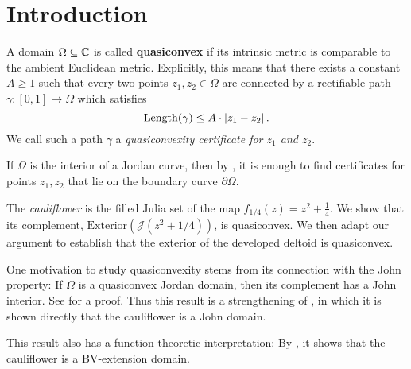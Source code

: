 


\section{Introduction}
A domain $\Omega\subseteq\mathbb{C}$ is called \textbf{quasiconvex }if its
intrinsic metric is comparable to the ambient Euclidean metric. Explicitly,
this means that there exists a constant $A\geq1$ such that every
two points $z_{1},z_{2}\in\Omega$ are connected by a rectifiable path $\gamma:\left[0,1\right]\to\Omega$
which satisfies
\[
\operatorname{Length}(\gamma)\leq A\cdot\left|z_{1}-z_{2}\right|.
\]
We call such a path $\gamma$ a \emph{quasiconvexity certificate for
	$z_{1}$ and $z_{2}$}.

If $\Omega$ is the interior of a Jordan curve, then by \cite[Corollary F]{hakobyan_euclidean_2008},
it is enough to find certificates for points $z_{1},z_{2}$ that lie
on the boundary curve $\partial\Omega$.%
\begin{comment}
It is also shown in \cite{hakobyan_euclidean_2008} that any quasidisk is quasiconvex.
\end{comment}

The \emph{cauliflower} is the filled Julia set of the map $f_{1/4}(z) = z^2+\frac 14$.
We show that its complement, $\mathrm{Exterior}(\mathcal{J}(z^{2}+1/4))$,
is quasiconvex. We then adapt our argument to establish that the exterior of the developed deltoid is quasiconvex.

One motivation to study quasiconvexity stems from its connection with the
John property: If $\Omega$ is a quasiconvex Jordan domain, then its complement has a John interior. See \cite[Corollary 3.4]{hakobyan_euclidean_2008} for a proof.
Thus this result is a strengthening of \cite[Theorem 6.1]{carleson_julia_1994}, in which it is shown directly that the cauliflower is a John domain.

This result also has a function-theoretic interpretation: By \cite[Theorem 1.1]{koskela_geometric_2010}, it shows that the cauliflower is a BV-extension domain.

\begin{comment}
The Filled Julia set of $z^{2}+1/4$, called the cauliflower, has
an inward-pointing cusp and hence is not quasiconvex.
\end{comment}

\begin{comment}
Thus, for any $c$ in 

For values $c$ in quadratic polynomials $f_{c}(z)=z^{2}+c$
\end{comment}
\begin{comment}
If $f_{c}$ has an attracting fixed point then its Julia set $\mathcal{J}(f_{c})$
is a quasicircle, hence its interior and exterior are both quasiconvex.
This is the case for values of $c$ in the main cardioid of the Mandelbrot
set.
, i.e.\ for 
\[
c\in\left\{ -\frac{\lambda}{2}-\frac{\lambda^{2}}{4}:\,\left|\lambda\right|<1\right\} .
\]
\end{comment}

